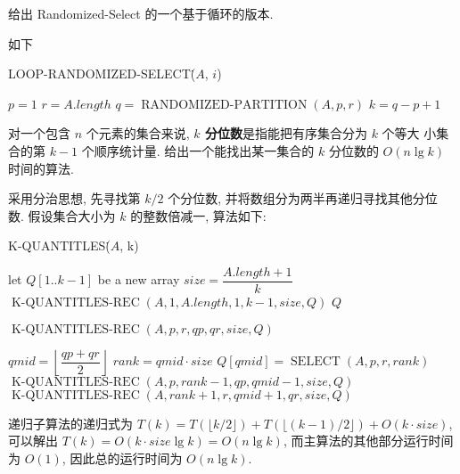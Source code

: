 \documentclass[boxes]{homework}
\begin{document}
\begin{problem}
给出 {\sc Randomized-Select} 的一个基于循环的版本.
\end{problem}
\begin{solution}
    如下
    \begin{algo}
        \caption{LOOP-RANDOMIZED-SELECT\.($A$, $i$)}
        $p = 1$\;
        $r = A.length$\;
         {
            $q = \operatorname{RANDOMIZED-PARTITION}(A, p, r)$\;
            $k = q - p + 1$\;
        }
    \end{algo}

\end{solution}


\begin{problem}
对一个包含 $n$ 个元素的集合来说, {\bf $k$ 分位数}是指能把有序集合分为 $k$ 个等大
小集合的第 $k - 1$ 个顺序统计量. 给出一个能找出某一集合的 $k$ 分位数的
$O(n\lg k)$ 时间的算法.
\end{problem}
\begin{solution}
    采用分治思想, 先寻找第 $k / 2$ 个分位数, 并将数组分为两半再递归寻找其他分位
    数. 假设集合大小为 $k$ 的整数倍减一, 算法如下:
    \begin{algo}
        \caption{K-QUANTITLES\.($A$, k)}
        \label{algo:9.3-6}
        let $Q[1 .. k-1]$ be a new array\;
        $size = \dfrac{ A.length + 1 }{ k }$\;
        $\operatorname{K-QUANTITLES-REC}(A, 1, A.length, 1, k - 1, size, Q)$\;
        \Return $Q$
    \end{algo}
    \begin{algo}
        \caption{$\operatorname{K-QUANTITLES-REC}(A, p, r, qp, qr, size, Q)$}
        \label{algo:9.3-6-rec}
         {
            \Return\;
        }
        $qmid = \left\lfloor \dfrac{ qp + qr }{ 2 }\right\rfloor$\;
        $rank = qmid \cdot size$\;
        $Q[qmid] = \operatorname{SELECT}(A, p, r, rank)$\;
        $\operatorname{K-QUANTITLES-REC}(A, p, rank - 1, qp, qmid - 1, size, Q)$\;
        $\operatorname{K-QUANTITLES-REC}(A, rank + 1, r, qmid + 1, qr, size, Q)$\;
        \Return\;
    \end{algo}
    递归子算法的递归式为 $T(k) = T(\lfloor k / 2\rfloor) + T(\lfloor (k - 1)
        / 2\rfloor) + O(k \cdot size)$, 可以解出
    $T(k) = O(k \cdot size\lg k) = O(n\lg k)$, 而主算法的其他部分运行时间为
    $O(1)$, 因此总的运行时间为 $O(n\lg k)$.
\end{solution}
\end{document}
